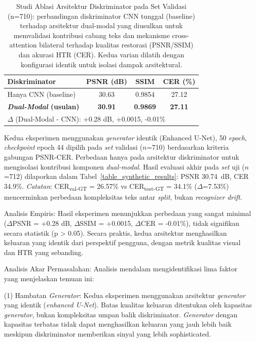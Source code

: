 \documentclass[journal]{IEEEtran}
\begin{document}
\begin{table}[!t]
\renewcommand{\arraystretch}{1.3}
\caption{Studi Ablasi Arsitektur Diskriminator pada Set Validasi (n=710): perbandingan diskriminator CNN tunggal (baseline) terhadap arsitektur dual-modal yang diusulkan untuk memvalidasi kontribusi cabang teks dan mekanisme cross-attention bilateral terhadap kualitas restorasi (PSNR/SSIM) dan akurasi HTR (CER). Kedua varian dilatih dengan konfigurasi identik untuk isolasi dampak arsitektural.}
\label{table_ablation_discriminator}
\centering
\begin{tabular}{|l|c|c|c|}
\hline
\textbf{Diskriminator} & \textbf{PSNR (dB)} & \textbf{SSIM} & \textbf{CER (\%)} \\
\hline
Hanya CNN (baseline) & 30.63 & 0.9854 & 27.12 \\
\textbf{\textit{Dual-Modal} (usulan)} & \textbf{30.91} & \textbf{0.9869} & \textbf{27.11} \\
\hline
\multicolumn{4}{|l|}{$\Delta$ (Dual-Modal - CNN): +0.28 dB, +0.0015, -0.01\%} \\
\hline
\end{tabular}
\vspace{2mm}

\small{Kedua eksperimen menggunakan \textit{generator} identik (Enhanced U-Net), 50 \textit{epoch}, \textit{checkpoint} epoch 44 dipilih pada \textit{set} validasi ($n$=710) berdasarkan kriteria gabungan PSNR-CER. Perbedaan hanya pada arsitektur diskriminator untuk mengisolasi kontribusi komponen \textit{dual-modal}. Hasil evaluasi akhir pada \textit{set} uji ($n$=712) dilaporkan dalam Tabel~\ref{table_synthetic_results}: PSNR 30.74~dB, CER 34.9\%. \textit{Catatan}: CER\textsubscript{val-GT} = 26.57\% vs CER\textsubscript{test-GT} = 34.1\% ($\Delta$=7.53\%) mencerminkan perbedaan kompleksitas teks antar \textit{split}, bukan \textit{recognizer drift}.}
\end{table}

Analisis Empiris: Hasil eksperimen menunjukkan perbedaan yang sangat minimal ($\Delta$PSNR = +0.28 dB, $\Delta$SSIM = +0.0015, $\Delta$CER = -0.01\%), tidak signifikan secara statistik (p > 0.05). Secara praktis, kedua arsitektur menghasilkan keluaran yang identik dari perspektif pengguna, dengan metrik kualitas visual dan HTR yang sebanding.

Analisis Akar Permasalahan: Analisis mendalam mengidentifikasi lima faktor yang menjelaskan temuan ini:

(1) Hambatan \textit{Generator}: Kedua eksperimen menggunakan arsitektur \textit{generator} yang identik (\textit{enhanced U-Net}). Batas kualitas keluaran ditentukan oleh kapasitas \textit{generator}, bukan kompleksitas umpan balik diskriminator. \textit{Generator} dengan kapasitas terbatas tidak dapat menghasilkan keluaran yang jauh lebih baik meskipun diskriminator memberikan sinyal yang lebih sophisticated.
\end{document}
